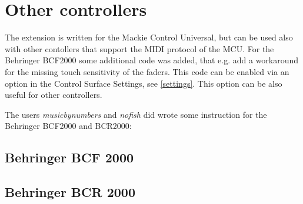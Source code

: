 \section{Other controllers}\label{other}

The extension is written for the Mackie Control Universal, but can be used also
with other contollers that support the MIDI protocol of the MCU. For the
Behringer BCF2000 some additional code was added, that e.g. add a workaround 
for the missing touch sensitivity of the faders. This code can be enabled via an
option in the \mcu Control Surface Settings, see \ref{settings}. This option
can be also useful for other controllers. 

The users {\it musicbynumbers} and
{\it nofish} did wrote some instruction for the Behringer BCF2000 and BCR2000:

\subsection{Behringer BCF 2000}\label{BCF}


\subsection{Behringer BCR 2000}\label{BCR}

